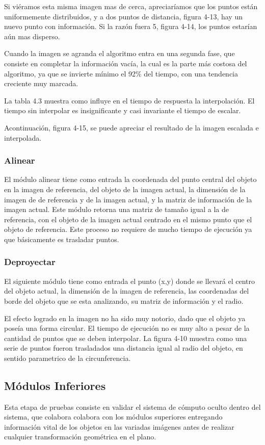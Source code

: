Si viéramos esta misma imagen mas de cerca, apreciaríamos que los puntos están
uniformemente distribuidos, y a dos puntos de distancia, figura 4-13, hay un
nuevo punto con información. Si la razón fuera 5, figura 4-14, los puntos
estarían
aún mas disperso.

Cuando la imagen se agranda el algoritmo entra en una segunda fase, que
consiste en completar la información vacía, la cual es la parte más costosa del
algoritmo,
ya que se invierte mínimo el 92\% del tiempo, con una tendencia creciente muy
marcada.

La tabla 4.3 muestra como influye en el tiempo de respuesta la interpolación. El
tiempo
sin interpolar es insignificante y casi invariante el tiempo de escalar.

Acontinuación, figura 4-15, se puede apreciar el resultado de la imagen escalada
e
interpolada.

\subsubsection{Alinear}
El módulo alinear tiene como entrada la coordenada del punto central del objeto
en la imagen de referencia, del objeto de la imagen actual, la dimensión de la
imagen de de referencia y de la imagen actual, y la matriz de información de la
imagen actual. Este módulo retorna una matriz de tamaño igual a la de
referencia, con el objeto de la imagen actual centrado en el mismo punto que el
objeto de referencia. Este proceso no requiere de mucho tiempo de ejecución ya
que básicamente es trasladar puntos.

\subsubsection{Deproyectar}
El siguiente módulo tiene como entrada el punto (x,y) donde se llevará el centro
del objeto actual, la dimensión de la imagen de referencia, las coordenadas del
borde del objeto que se esta analizando, su matriz de información y el radio.

El efecto logrado en la imagen no ha sido muy notorio, dado que el objeto ya
poseía una forma circular. El tiempo de ejecución no es muy alto a pesar de la
cantidad de puntos que se deben interpolar. La figura 4-10 muestra como una
serie de puntos fueron trasladados una distancia igual al radio del objeto, en
sentido parametrico de la circunferencia.

\subsection{Módulos Inferiores}
Esta etapa de pruebas consiste en validar el sistema de cómputo oculto dentro
del
sistema, que colabora colabora con los módulos superiores entregando información
vital
de los objetos en las variadas imágenes antes de realizar cualquier
transformación
geométrica en el plano.


